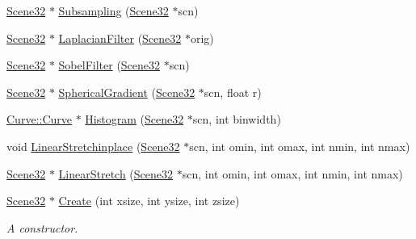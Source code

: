 \begin{DoxyCompactItemize}
\item 
\hyperlink{namespacegft_1_1Scene32_ae492ac529c9149889605a7bebd647c46}{Scene32} $\ast$ \hyperlink{namespacegft_1_1Scene32_ac4ba9b1d86c29e0865170ab6f523a557}{Subsampling} (\hyperlink{namespacegft_1_1Scene32_ae492ac529c9149889605a7bebd647c46}{Scene32} $\ast$scn)
\item 
\hyperlink{namespacegft_1_1Scene32_ae492ac529c9149889605a7bebd647c46}{Scene32} $\ast$ \hyperlink{namespacegft_1_1Scene32_a658a6f4991e61e22ba043633deac4040}{Laplacian\-Filter} (\hyperlink{namespacegft_1_1Scene32_ae492ac529c9149889605a7bebd647c46}{Scene32} $\ast$orig)
\item 
\hyperlink{namespacegft_1_1Scene32_ae492ac529c9149889605a7bebd647c46}{Scene32} $\ast$ \hyperlink{namespacegft_1_1Scene32_a595e31048f4ee6b5c0a8ce3b649c8e10}{Sobel\-Filter} (\hyperlink{namespacegft_1_1Scene32_ae492ac529c9149889605a7bebd647c46}{Scene32} $\ast$scn)
\item 
\hyperlink{namespacegft_1_1Scene32_ae492ac529c9149889605a7bebd647c46}{Scene32} $\ast$ \hyperlink{namespacegft_1_1Scene32_a75c0ca61199af5128a1b1bc0eebecece}{Spherical\-Gradient} (\hyperlink{namespacegft_1_1Scene32_ae492ac529c9149889605a7bebd647c46}{Scene32} $\ast$scn, float r)
\item 
\hyperlink{namespacegft_1_1Curve_acc891f63f04c17f7b2cafe7ed9ecffdb}{Curve\-::\-Curve} $\ast$ \hyperlink{namespacegft_1_1Scene32_a83767300186ca051e04fb54b7345f066}{Histogram} (\hyperlink{namespacegft_1_1Scene32_ae492ac529c9149889605a7bebd647c46}{Scene32} $\ast$scn, int binwidth)
\item 
void \hyperlink{namespacegft_1_1Scene32_a792c9b11ac58867f19cc1d9b91f8c793}{Linear\-Stretchinplace} (\hyperlink{namespacegft_1_1Scene32_ae492ac529c9149889605a7bebd647c46}{Scene32} $\ast$scn, int omin, int omax, int nmin, int nmax)
\item 
\hyperlink{namespacegft_1_1Scene32_ae492ac529c9149889605a7bebd647c46}{Scene32} $\ast$ \hyperlink{namespacegft_1_1Scene32_ac633de704eb66226a052db7bab46fb92}{Linear\-Stretch} (\hyperlink{namespacegft_1_1Scene32_ae492ac529c9149889605a7bebd647c46}{Scene32} $\ast$scn, int omin, int omax, int nmin, int nmax)
\item 
\hyperlink{namespacegft_1_1Scene32_ae492ac529c9149889605a7bebd647c46}{Scene32} $\ast$ \hyperlink{namespacegft_1_1Scene32_ac5ddca32b712b667a1acf7826726791f}{Create} (int xsize, int ysize, int zsize)
\begin{DoxyCompactList}\small\item\em A constructor. \end{DoxyCompactList}\item 

\end{DoxyCompactItemize}
